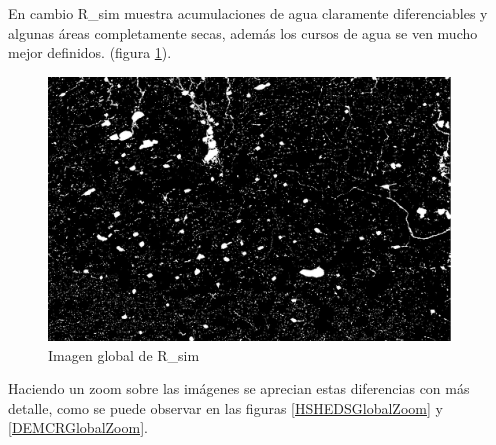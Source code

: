 \documentclass[10pt,a4paper, twoside]{report}
\begin{document}
En cambio R\_sim muestra acumulaciones de agua claramente diferenciables y algunas áreas completamente secas, además los cursos de agua se ven mucho mejor definidos. (figura \ref{DEMCRGlobal}).

\begin{figure}[!htb]
   \centering      
   \includegraphics[width=0.95\textwidth]{imagenes/DEMCRGlobal.jpg}
 \caption{Imagen global de R\_sim}
 \label{DEMCRGlobal}
\end{figure}

Haciendo un zoom sobre las imágenes se aprecian estas diferencias con más detalle, como se puede observar en las figuras \ref{HSHEDSGlobalZoom} y \ref{DEMCRGlobalZoom}.
\end{document}
